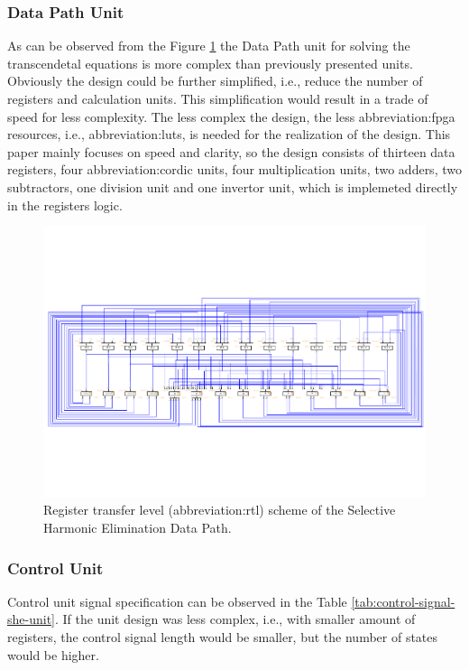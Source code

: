 \documentclass[a4paper, twoside, 11pt]{article}
\begin{document}
        \subsubsection{Data Path Unit}\label{sh:data-path-unit}
            As can be observed from the Figure \ref{fig:she-rtl} the Data Path unit for solving the transcendetal equations is more complex than previously presented units. Obviously the design could be further simplified, i.e., reduce the number of registers and calculation units. This simplification would result in a trade of speed for less complexity. The less complex the design, the less \gls{abbreviation:fpga} resources, i.e., \gls{abbreviation:lut}s, is needed for the realization of the design. This paper mainly focuses on speed and clarity, so the design consists of thirteen data registers, four \gls{abbreviation:cordic} units, four multiplication units, two adders, two subtractors, one division unit and one invertor unit, which is implemeted directly in the registers logic.
            \begin{figure}[htbp!]
                \centering
                \includegraphics[width=1\textwidth]{src/pdf/she-rtl.pdf}
                \caption{Register transfer level (\gls{abbreviation:rtl}) scheme of the Selective Harmonic Elimination Data Path.}
                \label{fig:she-rtl}
            \end{figure}
    
    \FloatBarrier
        \subsubsection{Control Unit}\label{subsubsec:sh-elimination-control-unit}
            Control unit signal specification can be observed in the Table \ref{tab:control-signal-she-unit}. If the unit design was less complex, i.e., with smaller amount of registers, the control signal length would be smaller, but the number of states would be higher.
\end{document}
